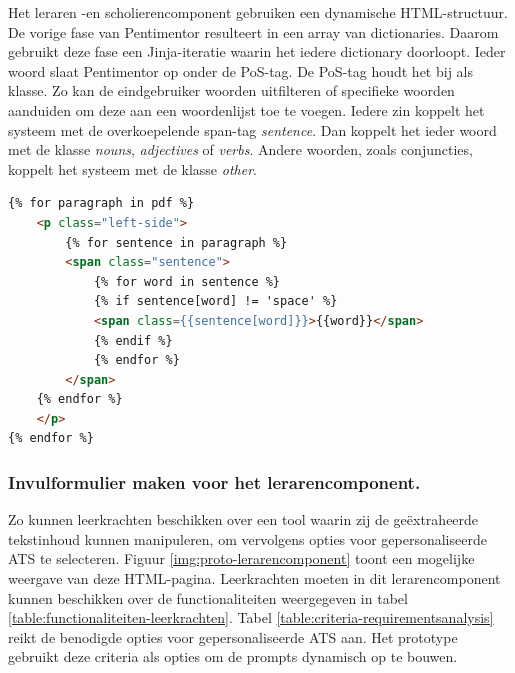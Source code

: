 Het leraren -en scholierencomponent gebruiken een dynamische HTML-structuur. De vorige fase van Pentimentor resulteert in een array van dictionaries. Daarom gebruikt deze fase een Jinja-iteratie waarin het iedere dictionary doorloopt. Ieder woord slaat Pentimentor op onder de PoS-tag. De PoS-tag houdt het bij als klasse. Zo kan de eindgebruiker woorden uitfilteren of specifieke woorden aanduiden om deze aan een woordenlijst toe te voegen. Iedere zin koppelt het systeem met de overkoepelende span-tag \textit{sentence}. Dan koppelt het ieder woord met de klasse \textit{nouns}, \textit{adjectives} of \textit{verbs}. Andere woorden, zoals conjuncties, koppelt het systeem met de klasse \textit{other}.

\begin{lstlisting}[language=html, caption={Het doorlopen van de PDF-tekst op de webpagina en het toekennen van de span-tags.}, label={code:html-span-tags}]
{% for paragraph in pdf %}
	<p class="left-side">
		{% for sentence in paragraph %}
		<span class="sentence">
			{% for word in sentence %}
			{% if sentence[word] != 'space' %}
			<span class={{sentence[word]}}>{{word}}</span>
			{% endif %}
			{% endfor %}
		</span>
	{% endfor %}
	</p>
{% endfor %}
\end{lstlisting}


\subsubsection{Invulformulier maken voor het lerarencomponent.}

Zo kunnen leerkrachten beschikken over een tool waarin zij de geëxtraheerde tekstinhoud kunnen manipuleren, om vervolgens opties voor gepersonaliseerde ATS te selecteren. Figuur \ref{img:proto-lerarencomponent} toont een mogelijke weergave van deze HTML-pagina. Leerkrachten moeten in dit lerarencomponent kunnen beschikken over de functionaliteiten weergegeven in tabel \ref{table:functionaliteiten-leerkrachten}. Tabel \ref{table:criteria-requirementsanalysis} reikt de benodigde opties voor gepersonaliseerde ATS aan. Het prototype gebruikt deze criteria als opties om de prompts dynamisch op te bouwen.

